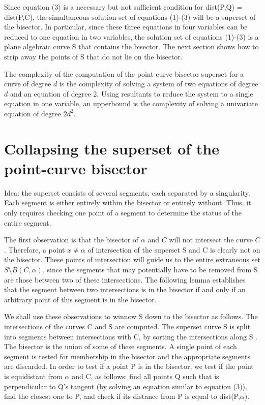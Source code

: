 
\vspace{.25in}
\noindent Since equation (3) is a necessary but not sufficient condition for 
dist(P,Q) = dist(P,C),
the simultaneous solution set of equations (1)-(3) will be a superset of 
the bisector.
In particular, since these three equations in four variables can be reduced 
to one 
equation in two variables, the solution set of 
equations (1)-(3) is a plane algebraic curve S that contains the bisector.
The next section shows how to strip away the points of S that do not lie on 
the bisector.

The complexity of the computation of the point-curve bisector superset for a 
curve of degree $d$ is the complexity of solving a system of two equations 
of degree $d$ and an equation of degree 2.
Using resultants to reduce the system to a single equation in one variable,
an upperbound is the complexity of solving a univariate equation of 
degree $2d^{2}$.

\section{Collapsing the superset of the point-curve bisector}
\label{sec-col1}

Idea: the superset consists of several segments, each separated by a singularity.
Each segment is either entirely within the bisector or entirely without.
Thus, it only requires checking one point of a segment to determine the status
of the entire segment.

The first observation is that the bisector of $\alpha$ and $C$ will 
not intersect the curve $C$.
Therefore, a point $x \neq \alpha$ of intersection of the superset S and C is 
clearly not on the bisector.
These points of intersection will guide us to the entire extraneous set 
$S \setminus B(C,\alpha)$, since the segments that may potentially have 
to be removed from S are those between two of these intersections.
The following lemma establishes that the segment between two intersections 
is in the bisector if and only if an arbitrary point of this segment is in 
the bisector.

We shall use these observations to winnow S down to the bisector as follows.
The intersections of the curves C and S are computed.
The superset curve S is split into segments between intersections with C, by
sorting the intersections along S \cite{jj}.
The bisector is the union of some of these segments.
A single point of each segment is tested for membership in the bisector
and the appropriate segments are discarded.
In order to test if a point P is in the bisector,
we test if the point is equidistant from $\alpha$ and C, as follows:
find all points Q such that  is perpendicular to Q's tangent 
(by solving an equation similar to equation (3)),
find the closest one to P, and check if its distance from P is equal to 
dist(P,$\alpha$).

